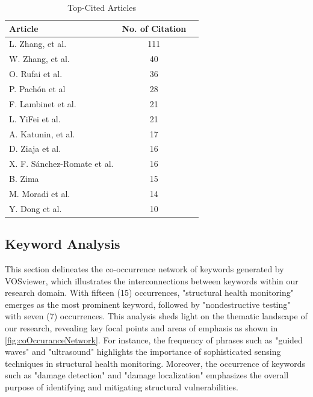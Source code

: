 \documentclass[journal, a4paper]{IEEEtran}
\begin{document}
\begin{table}[h]

  \centering
  \caption{Top-Cited Articles}
  \label{tbl:articleCites}
  \begin{tabular}{lcc}

      \toprule
      \textbf{Article} & \textbf{No. of Citation} \\
      \midrule
      L. Zhang, et al. \cite{zhang_structural_2021} & 111 \\
      W. Zhang, et al. \cite{zhang_defect_2020} & 40 \\
      O. Rufai et al. \cite{rufai_cure_2020} & 36 \\
      P. Pachón et al \cite{pachon_evaluation_2020} & 28 \\
      F. Lambinet et al. \cite{lambinet_measurement_2022} & 21 \\
      L. YiFei et al. \cite{yifei_structure_2023} & 21 \\
      A. Katunin, et al. \cite{katunin_modeling_2021} & 17 \\
      D. Ziaja et al. \cite{ziaja_shm_2021} & 16 \\
      X. F. Sánchez-Romate et al. \cite{sanchez-romate_structural_2021} & 16 \\
      B. Zima \cite{zima_damage_2021} & 15 \\
      M. Moradi et al. \cite{moradi_intelligent_2023} & 14 \\
      Y. Dong et al. \cite{dong_ultrasonic_2022} & 10 \\

      \bottomrule
  \end{tabular}
\end{table}




\subsection{Keyword Analysis}
This section delineates the co-occurrence network of keywords generated by VOSviewer,
which illustrates the interconnections between keywords within our research domain.
With fifteen (15) occurrences, "structural health monitoring" emerges as the most prominent keyword, followed by
"nondestructive testing" with seven (7) occurrences. This analysis sheds light on the thematic landscape of our research,
revealing key focal points and areas of emphasis as shown in \autoref{fig:coOccuranceNetwork}.
For instance, the frequency of phrases such as
"guided waves" and "ultrasound" highlights the importance of sophisticated sensing techniques in structural
health monitoring. Moreover, the occurrence of keywords such as "damage detection" and "damage localization"
emphasizes the overall purpose of identifying and mitigating structural vulnerabilities.
\end{document}
